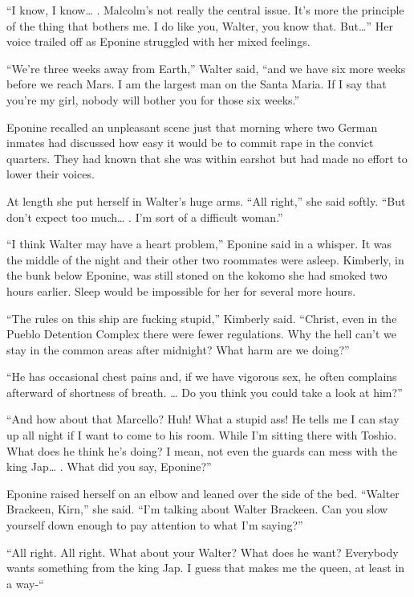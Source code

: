 \documentclass[]{article}
\begin{document}
{“I know, I know… .  Malcolm’s not really the central issue.  It’s more the principle of the thing that bothers me.  I do like you, Walter, you know that.  But…” Her voice trailed off as Eponine struggled with her mixed feelings.

“We’re three weeks away from Earth,” Walter said, “and we have six more weeks before we reach Mars.  I am the largest man on the Santa Maria.  If I say that you’re my girl, nobody will bother you for those six weeks.”

Eponine recalled an unpleasant scene just that morning where two German inmates had discussed how easy it would be to commit rape in the convict quarters.  They had known that she was within earshot but had made no effort to lower their voices.

At length she put herself in Walter’s huge arms.  “All right,” she said softly.  “But don’t expect too much… .  I’m sort of a difficult woman.”

“I think Walter may have a heart problem,” Eponine said in a whisper.  It was the middle of the night and their other two roommates were asleep.  Kimberly, in the bunk below Eponine, was still stoned on the kokomo she had smoked two hours earlier.  Sleep would be impossible for her for several more hours.

“The rules on this ship are fucking stupid,” Kimberly said.  “Christ, even in the Pueblo Detention Complex there were fewer regulations.  Why the hell can’t we stay in the common areas after midnight? What harm are we doing?”

“He has occasional chest pains and, if we have vigorous sex, he often complains afterward of shortness of breath.  … Do you think you could take a look at him?”

“And how about that Marcello? Huh! What a stupid ass! He tells me I can stay up all night if I want to come to his room.  While I’m sitting there with Toshio.  What does he think he’s doing? I mean, not even the guards can mess with the king Jap… .  What did you say, Eponine?”

Eponine raised herself on an elbow and leaned over the side of the bed.  “Walter Brackeen, Kirn,” she said.  “I’m talking about Walter Brackeen.  Can you slow yourself down enough to pay attention to what I’m saying?”

“All right.  All right.  What about your Walter? What does he want? Everybody wants something from the king Jap.  I guess that makes me the queen, at least in a way-“

}
\end{document}
